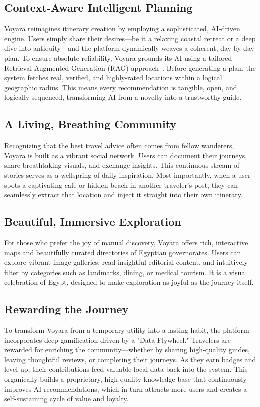\subsection{Context-Aware Intelligent Planning}
Voyara reimagines itinerary creation by employing a sophisticated, AI-driven engine. Users simply share their desires---be it a relaxing coastal retreat or a deep dive into antiquity---and the platform dynamically weaves a coherent, day-by-day plan. To ensure absolute reliability, Voyara grounds its AI using a tailored Retrieval-Augmented Generation (RAG) approach~\cite{lewis2020retrieval}. Before generating a plan, the system fetches real, verified, and highly-rated locations within a logical geographic radius. This means every recommendation is tangible, open, and logically sequenced, transforming AI from a novelty into a trustworthy guide.

\subsection{A Living, Breathing Community}
Recognizing that the best travel advice often comes from fellow wanderers, Voyara is built as a vibrant social network. Users can document their journeys, share breathtaking visuals, and exchange insights. This continuous stream of stories serves as a wellspring of daily inspiration. Most importantly, when a user spots a captivating cafe or hidden beach in another traveler's post, they can seamlessly extract that location and inject it straight into their own itinerary.

\subsection{Beautiful, Immersive Exploration}
For those who prefer the joy of manual discovery, Voyara offers rich, interactive maps and beautifully curated directories of Egyptian governorates. Users can explore vibrant image galleries, read insightful editorial content, and intuitively filter by categories such as landmarks, dining, or medical tourism. It is a visual celebration of Egypt, designed to make exploration as joyful as the journey itself.

\subsection{Rewarding the Journey}
To transform Voyara from a temporary utility into a lasting habit, the platform incorporates deep gamification driven by a "Data Flywheel." Travelers are rewarded for enriching the community---whether by sharing high-quality guides, leaving thoughtful reviews, or completing their journeys. As they earn badges and level up, their contributions feed valuable local data back into the system. This organically builds a proprietary, high-quality knowledge base that continuously improves AI recommendations, which in turn attracts more users and creates a self-sustaining cycle of value and loyalty.

